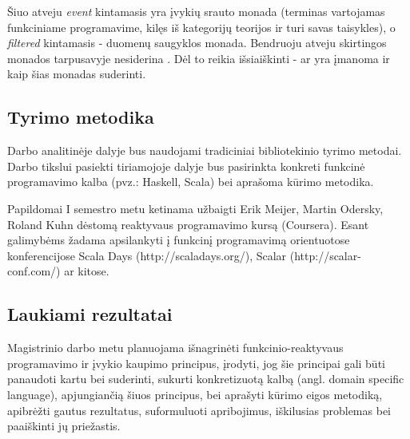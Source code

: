 \documentclass[12pt, a4paper, lithuanian]{article}
\begin{document}
    Šiuo atveju \emph{event} kintamasis yra įvykių srauto monada (terminas vartojamas funkciniame programavime, kilęs iš kategorijų teorijos ir turi savas taisykles), o \emph{filtered} kintamasis - duomenų saugyklos monada. Bendruoju atveju skirtingos monados tarpusavyje nesiderina \cite{DBLP:conf/fp/KingW92}. Dėl to reikia išsiaiškinti - ar yra įmanoma ir kaip šias monadas suderinti.

\subsection{Tyrimo metodika}

    Darbo analitinėje dalyje bus naudojami tradiciniai bibliotekinio tyrimo metodai. Darbo tikslui pasiekti tiriamojoje dalyje bus pasirinkta konkreti funkcinė programavimo kalba (pvz.: Haskell, Scala) bei aprašoma kūrimo metodika.

    Papildomai I semestro metu ketinama užbaigti Erik Meijer, Martin Odersky, Roland Kuhn dėstomą reaktyvaus programavimo kursą (Coursera). Esant galimybėms žadama apsilankyti į funkcinį programavimą orientuotose konferencijose Scala Days (http://scaladays.org/), Scalar (http://scalar-conf.com/) ar kitose.

\subsection{Laukiami rezultatai}

    Magistrinio darbo metu planuojama išnagrinėti funkcinio-reaktyvaus programavimo ir įvykio kaupimo principus, įrodyti, jog šie principai gali būti panaudoti kartu bei suderinti, sukurti konkretizuotą kalbą (angl. domain specific language), apjungiančią šiuos principus, bei aprašyti kūrimo eigos metodiką, apibrėžti gautus rezultatus, suformuluoti apribojimus, iškilusias problemas bei paaiškinti jų priežastis.


\end{document}
